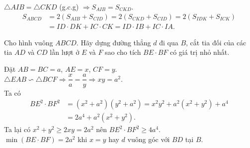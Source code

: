 \begin{bt}
{\begin{enumerate}
   $\triangle AIB = \triangle CKD$ (g.c.g) $\Rightarrow S_{AIB} = S_{CKD}$.
   \begin{align*}
    S_{ABCD} & = 2\left(S_{AIB} + S_{CID}\right) = 2\left(S_{CKD} + S_{CID}\right) = 2\left(S_{IDK} + S_{ICK}\right)\\
    &= ID \cdot DK + IC \cdot CK = ID \cdot IB + IC \cdot IA.
   \end{align*}
  \end{enumerate}
  }
\end{bt}


\begin{bt}%
 Cho hình vuông $ABCD$. Hãy dựng đường thẳng $d$ đi qua $B$, cắt tia đối của các tia $AD$ và $CD$ lần lượt ở $E$ và $F$ sao cho tích $BE \cdot BF$ có giá trị nhỏ nhất.
 \loigiai
  {
  \immini
  {
  Đặt $AB = BC =a$, $AE = x$, $CF = y$.\\
  $\triangle EAB \backsim \triangle BCF \Rightarrow \dfrac{x}{a} = \dfrac{a}{y} \Rightarrow xy = a^2$.\\
  Ta có
  \begin{align*}
   BE^2 \cdot BF^2 &= (x^2 + a^2)(y^2 + a^2) = x^2y^2 + a^2(x^2+y^2) + a^4 \\
   &= 2a^4 + a^2(x^2+y^2).
  \end{align*}
  Ta lại có $x^2 + y^2 \geq 2xy = 2a^2$ nên $BE^2 \cdot BF^2 \geq 4a^4$.\\
  $\min(BE \cdot BF) = 2a^2$ khi $x=y$ hay $d$ vuông góc với $BD$ tại $B$.
  }
  {
  }
  }
\end{bt}


